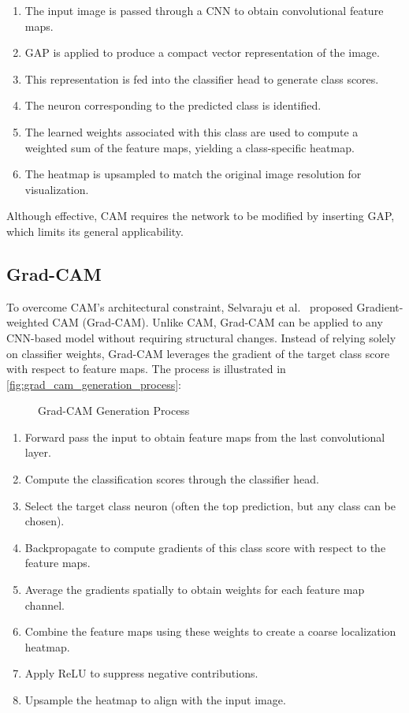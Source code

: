 \begin{enumerate}
    \item The input image is passed through a CNN to obtain convolutional feature maps.
    \item GAP is applied to produce a compact vector representation of the image.
    \item This representation is fed into the classifier head to generate class scores.
    \item The neuron corresponding to the predicted class is identified.
    \item The learned weights associated with this class are used to compute a weighted sum of the feature maps, yielding a class-specific heatmap.
    \item The heatmap is upsampled to match the original image resolution for visualization.
\end{enumerate}

Although effective, CAM requires the network to be modified by inserting GAP, which limits its general applicability.

\subsection{Grad-CAM}
\label{subsec:grad_cam}

To overcome CAM's architectural constraint, Selvaraju et al.~\cite{cam_grad} proposed Gradient-weighted CAM (Grad-CAM). Unlike CAM, Grad-CAM can be applied to any CNN-based model without requiring structural changes. Instead of relying solely on classifier weights, Grad-CAM leverages the gradient of the target class score with respect to feature maps. The process is illustrated in \autoref{fig:grad_cam_generation_process}:

\begin{figure}[htbp]
    \centering
    \caption{Grad-CAM Generation Process}
    \label{fig:grad_cam_generation_process}
\end{figure}

\begin{enumerate}
    \item Forward pass the input to obtain feature maps from the last convolutional layer.
    \item Compute the classification scores through the classifier head.
    \item Select the target class neuron (often the top prediction, but any class can be chosen).
    \item Backpropagate to compute gradients of this class score with respect to the feature maps.
    \item Average the gradients spatially to obtain weights for each feature map channel.
    \item Combine the feature maps using these weights to create a coarse localization heatmap.
    \item Apply ReLU to suppress negative contributions.
    \item Upsample the heatmap to align with the input image.
\end{enumerate}

